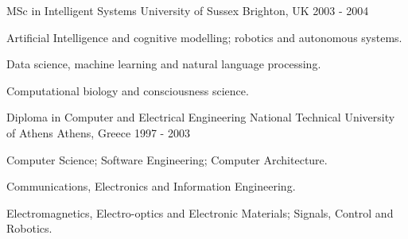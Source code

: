 

\begin{cventries}

  \cventry
    {MSc in Intelligent Systems} %
    {University of Sussex} %
    {Brighton, UK} %
    {2003 - 2004} %
    {
      \begin{cvitems} %
        \item {Artificial Intelligence and cognitive modelling; robotics and autonomous systems.}
        \item {Data science, machine learning and natural language processing.}
        \item {Computational biology and consciousness science.}
      \end{cvitems}
    }

  \cventry
    {Diploma in Computer and Electrical Engineering} %
    {National Technical University of Athens} %
    {Athens, Greece} %
    {1997 - 2003} %
    {
      \begin{cvitems} %
        \item {Computer Science; Software Engineering; Computer Architecture.}
        \item {Communications, Electronics and Information Engineering.}
        \item {Electromagnetics, Electro-optics and Electronic Materials; Signals, Control and Robotics.}
      \end{cvitems}
    }

\end{cventries}
